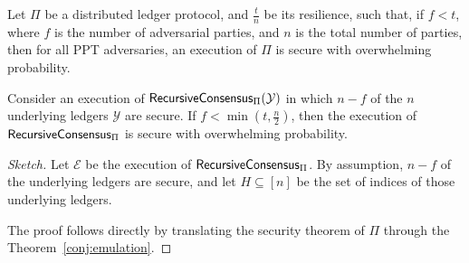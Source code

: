\begin{theorem}[Security]
  Let $\Pi$ be a distributed ledger protocol, and $\frac{t}{n}$ be its resilience, such
  that, if $f < t$, where $f$ is the number of adversarial parties, and $n$ is the total number of parties,
  then for all PPT adversaries, an execution of $\Pi$ is secure with overwhelming probability.

  Consider an execution of $\textsf{RecursiveConsensus}_{\Pi}(\mathcal{Y})$ in which $n-f$ of the $n$ underlying
  ledgers $\mathcal{Y}$ are secure. If $f < \min(t, \frac{n}{2})$, then the execution of $\textsf{RecursiveConsensus}_{\Pi}$
  is secure with overwhelming probability.
\end{theorem}
\begin{proof}[Sketch]
  Let $\mathcal{E}$ be the execution of $\textsf{RecursiveConsensus}_{\Pi}$. By assumption, $n-f$ of
  the underlying ledgers are secure, and let $H \subseteq [n]$ be the set of indices of those underlying ledgers.

  The proof follows directly by translating the security theorem of $\Pi$ through
  the Theorem~\ref{conj:emulation}.
  \Qed
\end{proof}

%
